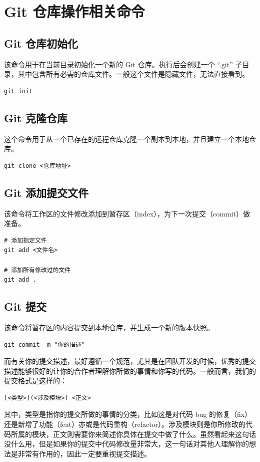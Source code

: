 \documentclass[UTF8]{gyh}
\begin{document}
\section{Git 仓库操作相关命令}

\subsection{Git 仓库初始化}
该命令用于在当前目录初始化一个新的 Git 仓库。执行后会创建一个 “.git” 子目录，其中包含所有必需的仓库文件。一般这个文件是隐藏文件，无法直接看到。
\begin{lstlisting}
git init
\end{lstlisting}

\subsection{Git 克隆仓库}
这个命令用于从一个已存在的远程仓库克隆一个副本到本地，并且建立一个本地仓库。
\begin{lstlisting}
git clone <仓库地址>
\end{lstlisting}

\subsection{Git 添加提交文件}
该命令将工作区的文件修改添加到暂存区（index），为下一次提交（commit）做准备。
\begin{lstlisting}
# 添加指定文件
git add <文件名>

# 添加所有修改过的文件
git add .
\end{lstlisting}

\subsection{Git 提交}
该命令将暂存区的内容提交到本地仓库，并生成一个新的版本快照。
\begin{lstlisting}
git commit -m "你的描述"
\end{lstlisting}
而有关你的提交描述，最好遵循一个规范，尤其是在团队开发的时候，优秀的提交描述能够很好的让你的合作者理解你所做的事情和你写的代码。一般而言，我们的提交格式是这样的：
\begin{lstlisting}
[<类型>](<涉及模块>) <正文>
\end{lstlisting}
其中，类型是指你的提交所做的事情的分类，比如这是对代码 bug 的修复（fix）还是新增了功能（feat）亦或是代码重构（refactor）。涉及模块则是你所修改的代码所属的模块，正文则需要你来简述你具体在提交中做了什么。虽然看起来这句话没什么用，但是如果你的提交中代码修改量非常大，这一句话对其他人理解你的想法是非常有作用的，因此一定要重视提交描述。
\end{document}
